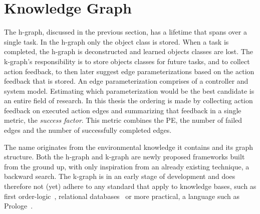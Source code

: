 \section{Knowledge Graph}%
\label{sec:k-graph}
The \ac{h-graph}, discussed in the previous section, has a lifetime that spans over a single task. In the \ac{h-graph} only the object class is stored. When a task is completed, the \ac{h-graph} is deconstructed and learned objects classes are lost. The \ac{k-graph}'s responsibility is to store objects classes for future tasks, and to collect action feedback, to then later suggest edge parameterizations based on the action feedback that is stored. An edge parameterization comprises of a controller and system model. Estimating which parameterization would be the best candidate is an entire field of research. In this thesis the ordering is made by collecting action feedback on executed action edges and summarizing that feedback in a single metric, the \textit{success factor}. This metric combines the \acl{PE}, the number of failed edges and the number of successfully completed edges.\bs

The name  originates from the environmental knowledge it contains and its graph structure. Both the \ac{h-graph} and \ac{k-graph} are newly proposed frameworks built from the ground up, with only inspiration from an already existing technique, a backward search. The \ac{k-graph} is in an early stage of development and does therefore not (yet) adhere to any standard that apply to knowledge bases, such as first order-logic~\cite{barwise_introduction_1977,rensink_representing_2004}, relational databases~\cite{atzeni_relational_1993} or more practical, a language such as Prologe~\cite{wielemaker_swiprolog_2012}.\bs







